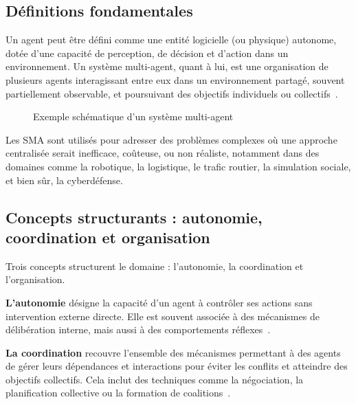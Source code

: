 \documentclass[ twoside,openright,titlepage,numbers=noenddot,headinclude,%
                footinclude=true,cleardoublepage=empty,abstractoff, %
                BCOR=5mm,paper=a4,fontsize=11pt,%
                french,american,%
                ]{scrreprt}
\begin{document}
\subsection*{Définitions fondamentales}

Un agent peut être défini comme une entité logicielle (ou physique) autonome, dotée d'une capacité de perception, de décision et d'action dans un environnement. Un système multi-agent, quant à lui, est une organisation de plusieurs agents interagissant entre eux dans un environnement partagé, souvent partiellement observable, et poursuivant des objectifs individuels ou collectifs~\cite{Jennings1998, Shoham2009}.

\begin{figure}[h]
    \centering
    \caption{Exemple schématique d'un système multi-agent}
    \label{fig:sma_architecture}
\end{figure}

Les SMA sont utilisés pour adresser des problèmes complexes où une approche centralisée serait inefficace, coûteuse, ou non réaliste, notamment dans des domaines comme la robotique, la logistique, le trafic routier, la simulation sociale, et bien sûr, la cyberdéfense.

\subsection*{Concepts structurants : autonomie, coordination et organisation}

Trois concepts structurent le domaine : l'autonomie, la coordination et l'organisation.

\textbf{L'autonomie} désigne la capacité d'un agent à contrôler ses actions sans intervention externe directe. Elle est souvent associée à des mécanismes de délibération interne, mais aussi à des comportements réflexes~\cite{Russell2010}.

\textbf{La coordination} recouvre l'ensemble des mécanismes permettant à des agents de gérer leurs dépendances et interactions pour éviter les conflits et atteindre des objectifs collectifs. Cela inclut des techniques comme la négociation, la planification collective ou la formation de coalitions~\cite{Durfee1999, Jennings1996}.
\end{document}
